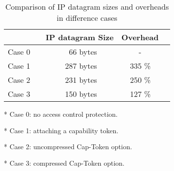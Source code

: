 \begin{table}[h]
	\centering
	\caption[Comparison of IP Datagram Sizes and Overheads in Difference Cases]{Comparison of IP datagram sizes and overheads in difference cases}
	\label{table:cmp}
\begin{threeparttable}
\begin{tabular}{llllrlllrll}
\toprule[1.1pt]
					& & 			\multicolumn{5}{c}{IP datagram Size}			& 			\multicolumn{3}{c}{Overhead} 		\\
\midrule[1.1pt]
	Case 0	& &							& &		66 bytes		& &								&					& \multicolumn{1}{c}{-}		&&             \\
	Case 1	& &							& &		287 bytes 	& &								&					& 335 \%									&&             \\
	Case 2	& &							& &		231 bytes		& &								&					& 250 \%									&&             \\
	Case 3	& &							& &		150 bytes		& &								&					& 127 \%									&&          	\\       
\bottomrule[1.1pt]
\end{tabular}
\begin{tablenotes}
\item[*] Case 0: no access control protection.
\item[*] Case 1: attaching a capability token.
\item[*] Case 2: uncompressed Cap-Token option.
\item[*] Case 3: compressed Cap-Token option.
\end{tablenotes}
\end{threeparttable}
\end{table}


